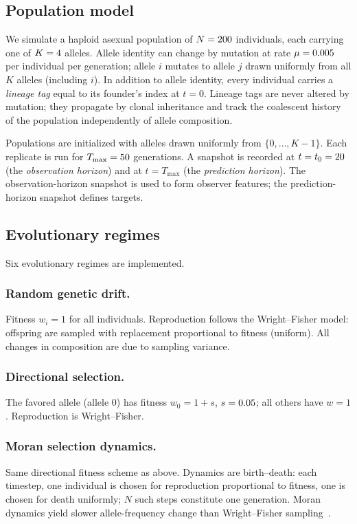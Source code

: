 \documentclass[11pt,a4paper]{article}
\newcommand{\Robs}{t_0}
\newcommand{\Tfin}{T_{\max}}
\begin{document}
\subsection{Population model}

We simulate a haploid asexual population of $N = 200$ individuals,
each carrying one of $K = 4$ alleles.
Allele identity can change by mutation at rate $\mu = 0.005$ per individual
per generation; allele $i$ mutates to allele $j$ drawn uniformly from all $K$
alleles (including $i$).
In addition to allele identity, every individual carries a \emph{lineage tag}
equal to its founder's index at $t = 0$.
Lineage tags are never altered by mutation; they propagate by clonal inheritance
and track the coalescent history of the population independently of allele
composition.

Populations are initialized with alleles drawn uniformly from $\{0,\ldots,K-1\}$.
Each replicate is run for $\Tfin = \Tmax$ generations.
A snapshot is recorded at $t = \Robs = \Tobs$ (the \emph{observation horizon})
and at $t = \Tfin$ (the \emph{prediction horizon}).
The observation-horizon snapshot is used to form observer features;
the prediction-horizon snapshot defines targets.

\subsection{Evolutionary regimes}
\label{sec:regimes}

Six evolutionary regimes are implemented.

\subsubsection{Random genetic drift.}
Fitness $w_i = 1$ for all individuals.
Reproduction follows the Wright--Fisher model:
offspring are sampled with replacement proportional to fitness (uniform).
All changes in composition are due to sampling variance.

\subsubsection{Directional selection.}
The favored allele (allele 0) has fitness $w_0 = 1 + s$, $s = 0.05$;
all others have $w = 1$.
Reproduction is Wright--Fisher.

\subsubsection{Moran selection dynamics.}
Same directional fitness scheme as above.
Dynamics are birth--death: each timestep, one individual is chosen for
reproduction proportional to fitness, one is chosen for death uniformly;
$N$ such steps constitute one generation.
Moran dynamics yield slower allele-frequency change than Wright--Fisher
sampling~\citep{Moran1958, Nowak2006}.
\end{document}
